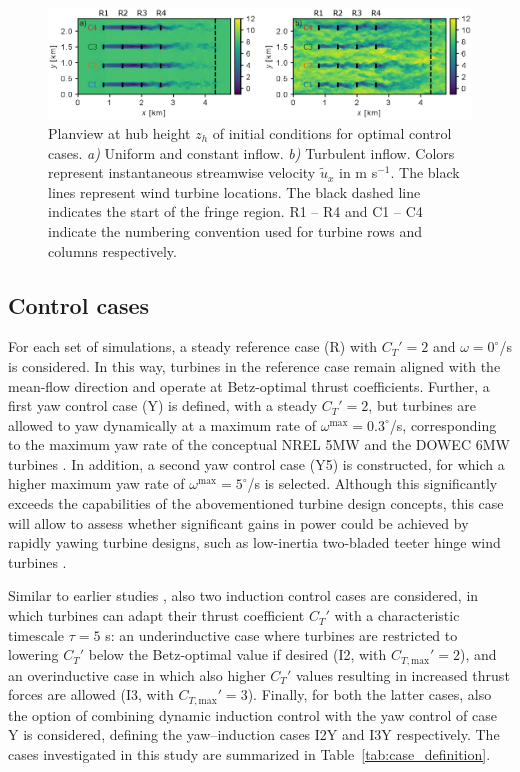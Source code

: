 \documentclass[energies,article,submit,moreauthors,latex,10pt,a4paper]{mdpi}
\newcommand{\revision}[1]{{\color{red} #1}}
\newcommand{\ctmax}{C_{T,\text{max}}'}
\begin{document}
\begin{figure}
	\includegraphics[width=\textwidth]{figure3}
	\caption{Planview at hub height $z_h$ of initial conditions for optimal control cases. \emph{a)} Uniform and \revision{constant} inflow. \emph{b)} Turbulent inflow. Colors represent instantaneous streamwise velocity $\widetilde{u}_x$ in m s$^{-1}$. The black lines represent wind turbine locations. The black dashed line indicates the start of the fringe region. R1 -- R4 and C1 -- C4 indicate the numbering convention used for turbine rows and columns respectively. \label{fig:initial_conditions_flow_yaw}}
\end{figure}

\subsection{Control cases}\label{sec:case_definition}

\noindent For each set of simulations, a steady reference case (R) with $C_T' = 2$ and $\omega = 0^\circ$/s is considered. In this way, turbines in the reference case remain aligned with the mean-flow direction and operate at Betz-optimal thrust coefficients. Further, a first yaw control case (Y) is defined, with a steady $C_T'=2$, but turbines are allowed to yaw dynamically at a maximum rate of $\omega^{\text{max}} = 0.3^\circ$/s, corresponding to the maximum yaw rate of the conceptual NREL 5MW and the DOWEC 6MW turbines \cite{jonkman2009definition, kooijman2003dowec}. In addition, a second yaw control case (Y5) is constructed, for which a higher maximum yaw rate of $\omega^{\text{max}} = 5^\circ$/s is selected. Although this significantly exceeds the capabilities of the abovementioned turbine design concepts, this case will allow to assess whether significant gains in power could be achieved by rapidly yawing turbine designs, such as low-inertia two-bladed teeter hinge wind turbines \cite{kim2014yaw}. 

Similar to earlier studies \cite{munters2016turbulent, munters2016effect}, also two induction control cases are considered, in which turbines can adapt their thrust coefficient $C_T'$ with a characteristic timescale $\tau = 5$ s: an underinductive case where turbines are restricted to lowering $C_T'$ below the Betz-optimal value if desired (I2, with $\ctmax = 2$), and an overinductive case in which also higher $C_T'$ values resulting in increased thrust forces are allowed (I3, with $\ctmax = 3$). Finally, for both the latter cases, also the option of combining dynamic induction control with the yaw control of case Y is considered, defining the yaw--induction cases I2Y and I3Y respectively. The cases investigated in this study are summarized in Table~\ref{tab:case_definition}. 
\end{document}
